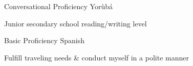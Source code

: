 

\begin{cventries}

  \cventry
    {Conversational Proficiency} %
    {Yor{\`u}b{\'a}} %
    {} %
    {} %
    {
      \begin{cvitems} %
        \item {Junior secondary school reading/writing level}
      \end{cvitems}
	}
	
  \cventry
    {Basic Proficiency} %
    {Spanish} %
    {} %
    {} %
    {
      \begin{cvitems} %
        \item {Fulfill traveling needs \& conduct myself in a polite manner}
      \end{cvitems}
	}

\end{cventries}
